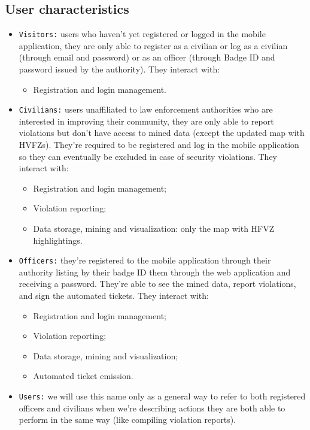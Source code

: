 \documentclass[12pt,a4paper]{article}
\begin{document}
\subsection{User characteristics}
 \begin{itemize}
\item \texttt{Visitors:} users who haven't yet registered or logged in the mobile application, they are only able to register as a civilian or log as a civilian (through email and password) or as an officer (through Badge ID and password issued by the authority). They interact with:
		\begin{itemize}
			\item Registration and login management.
		\end{itemize}

\item \texttt{Civilians:} users unaffiliated to law enforcement authorities who are interested in improving their community, they are only able to report violations but don't have access to mined data (except the updated map with HVFZs). They're required to be registered and log in the mobile application so they can eventually be excluded in case of security violations. They interact with: 
		\begin{itemize}
			\item Registration and login management;
			\item Violation reporting;
			\item Data storage, mining and visualization: only the map with HFVZ highlightings.
		\end{itemize}
 
\item \texttt{Officers:} they're registered to the mobile application through their authority listing by their badge ID them through the web application and receiving a password. They're able to see the mined data, report violations, and sign the automated tickets.  They interact with: 
		\begin{itemize}
			\item Registration and login management;
			\item Violation reporting;
			\item Data storage, mining and visualization;
			\item Automated ticket emission.
		\end{itemize}

\item \texttt{Users:} we will use this name only as a general way to refer to both registered officers and civilians when we're describing actions they are both able to perform in the same way (like compiling violation reports).


\end{itemize}
\end{document}
